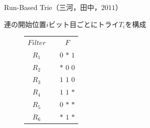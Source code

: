 \documentclass[12pt,dvipdfmx,mathserif,uplatex,aspectratio=32]{beamer}
\makeatletter
\newcommand{\tblcaption}[1]{\def\@captype{table}\caption{#1}}
\makeatother
\begin{document}
\begin{frame}{Run-Based Trie（三河，田中，$2011$）}

\vspace{1mm}
{\large \color{black}連の開始位置$i$ビット目ごとにトライ$T_{i}$を構成
}
\vspace{2mm}

\begin{figure}[h]
\begin{flushleft}
 \def\@captype{table}
 \begin{minipage}[t]{.38\textwidth}
  \begin{center}
  \begin{tabular}{ccc}
        & &    \\ \hline
 $Filter$ & & $F$ \\ \hline
 $R_{1}$ & & $0$ $*$ $1$ \\ 
 $R_{2}$ & & $*$ $0$ $0$ \\ 
 $R_{3}$ & & $1$ $1$ $0$ \\ 
 $R_{4}$ & & $1$ $1$ $*$ \\ 
 $R_{5}$ & & $0$ $*$ $*$ \\ 
 $R_{6}$ & & $*$ $1$ $*$ \\ \hline
  \end{tabular}
  \end{center}
 \end{minipage}
 \hfill
 \begin{minipage}[c]{.60\textwidth}
 \scalebox{0.7}{}
 \end{minipage}
\end{flushleft}
\end{figure}


\end{frame}
\end{document}
